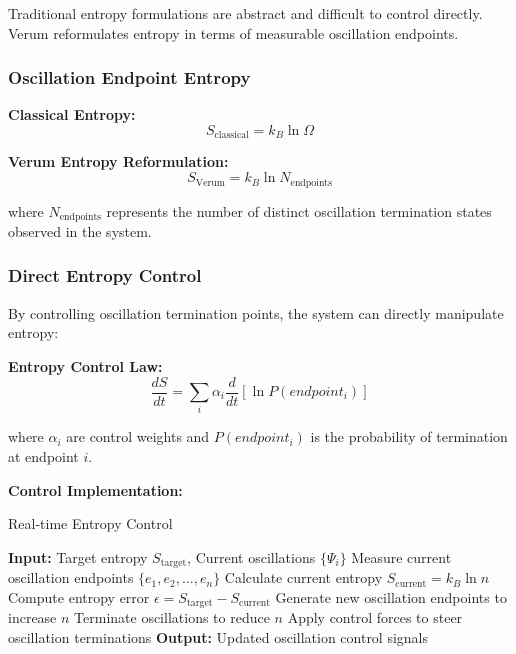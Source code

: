 \documentclass[11pt,a4paper]{article}
\begin{document}
Traditional entropy formulations are abstract and difficult to control directly. Verum reformulates entropy in terms of measurable oscillation endpoints.

\subsubsection{Oscillation Endpoint Entropy}

\textbf{Classical Entropy:}
\begin{equation}
S_{\text{classical}} = k_B \ln \Omega
\end{equation}

\textbf{Verum Entropy Reformulation:}
\begin{equation}
S_{\text{Verum}} = k_B \ln N_{\text{endpoints}}
\end{equation}

where $N_{\text{endpoints}}$ represents the number of distinct oscillation termination states observed in the system.

\subsubsection{Direct Entropy Control}

By controlling oscillation termination points, the system can directly manipulate entropy:

\textbf{Entropy Control Law:}
\begin{equation}
\frac{dS}{dt} = \sum_{i} \alpha_i \frac{d}{dt}[\ln P(endpoint_i)]
\end{equation}

where $\alpha_i$ are control weights and $P(endpoint_i)$ is the probability of termination at endpoint $i$.

\textbf{Control Implementation:}
\begin{algorithm}[H]
\caption{Real-time Entropy Control}
\begin{algorithmic}[1]
\STATE \textbf{Input:} Target entropy $S_{\text{target}}$, Current oscillations $\{\Psi_i\}$
\STATE Measure current oscillation endpoints $\{e_1, e_2, \ldots, e_n\}$
\STATE Calculate current entropy $S_{\text{current}} = k_B \ln n$
\STATE Compute entropy error $\epsilon = S_{\text{target}} - S_{\text{current}}$
    \STATE Generate new oscillation endpoints to increase $n$
    \STATE Terminate oscillations to reduce $n$
\ENDIF
\STATE Apply control forces to steer oscillation terminations
\STATE \textbf{Output:} Updated oscillation control signals
\end{algorithmic}
\end{algorithm}
\end{document}
